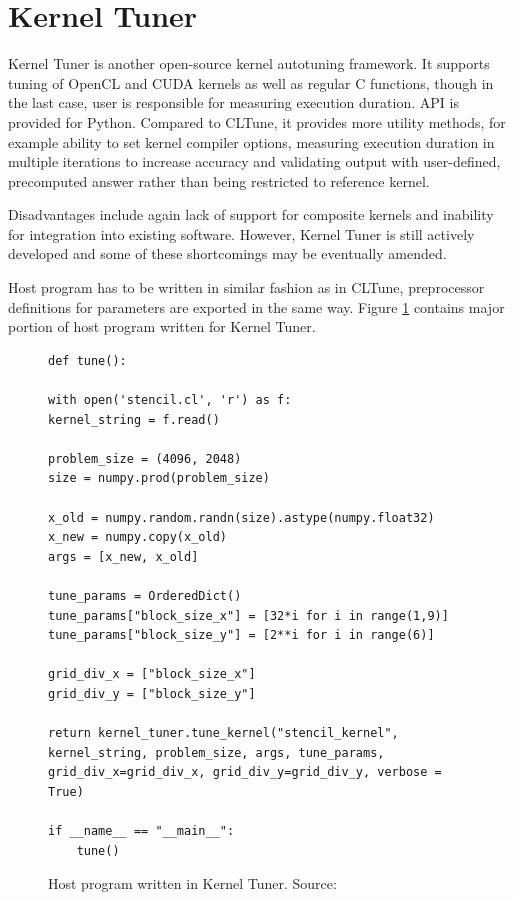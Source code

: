 \documentclass
[
    digital, %
    oneside, %
    table, %
    nolof, %
    nolot, %
    nocover %
]{fithesis3}
\begin{document}
\section{Kernel Tuner}
Kernel Tuner \cite{kerneltuner} is another open-source kernel autotuning framework. It supports tuning of OpenCL and CUDA kernels as well as regular
C functions, though in the last case, user is responsible for measuring execution duration. API is provided for Python. Compared to CLTune, it
provides more utility methods, for example ability to set kernel compiler options, measuring execution duration in multiple iterations to increase
accuracy and validating output with user-defined, precomputed answer rather than being restricted to reference kernel.

Disadvantages include again lack of support for composite kernels and inability for integration into existing software. However, Kernel Tuner is still
actively developed and some of these shortcomings may be eventually amended.

Host program has to be written in similar fashion as in CLTune, preprocessor definitions for parameters are exported in the same way. Figure
\ref{kerneltuner-example} contains major portion of host program written for Kernel Tuner.
\begin{figure}
\begin{lstlisting}
def tune():

with open('stencil.cl', 'r') as f:
kernel_string = f.read()

problem_size = (4096, 2048)
size = numpy.prod(problem_size)

x_old = numpy.random.randn(size).astype(numpy.float32)
x_new = numpy.copy(x_old)
args = [x_new, x_old]

tune_params = OrderedDict()
tune_params["block_size_x"] = [32*i for i in range(1,9)]
tune_params["block_size_y"] = [2**i for i in range(6)]

grid_div_x = ["block_size_x"]
grid_div_y = ["block_size_y"]

return kernel_tuner.tune_kernel("stencil_kernel", kernel_string, problem_size, args, tune_params, grid_div_x=grid_div_x, grid_div_y=grid_div_y, verbose = True)

if __name__ == "__main__":
    tune()
\end{lstlisting}
\caption{Host program written in Kernel Tuner. Source: \cite{kerneltuner-example}}
\label{kerneltuner-example}
\end{figure}
\end{document}
